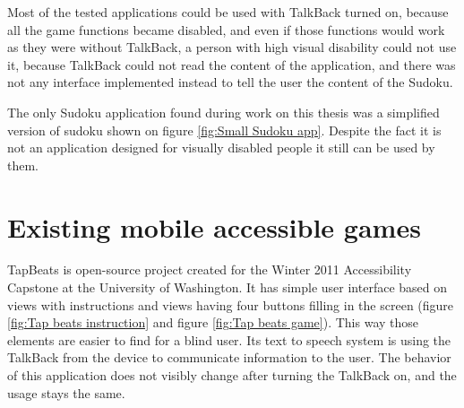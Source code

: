 \documentclass[a4paper,twoside,12pt]{book}
\begin{document}
\par Most of the tested applications could be used with TalkBack turned on, because all the game functions became disabled, and even if those functions would work as they were without TalkBack, a person with high visual disability could not use it, because TalkBack could not read the content of the application, and there was not any interface implemented instead to tell the user the content of the Sudoku.
\par The only Sudoku application found during work on this thesis was a simplified version of sudoku shown on figure \ref{fig:Small Sudoku app}. Despite the fact it is not an application designed for visually disabled people it still can be used by them.

\section {Existing mobile accessible games}

\par TapBeats is open-source project created for the Winter 2011 Accessibility Capstone at the University of Washington. It has simple user interface based on views with instructions and views having four buttons filling in the screen (figure \ref{fig:Tap beats instruction} and figure \ref{fig:Tap beats game}). This way those elements are easier to find for a blind user. Its text to speech system is using the TalkBack from the device to communicate information to the user. The behavior of this application does not visibly change after turning the TalkBack on, and the usage stays the same.
\end{document}
